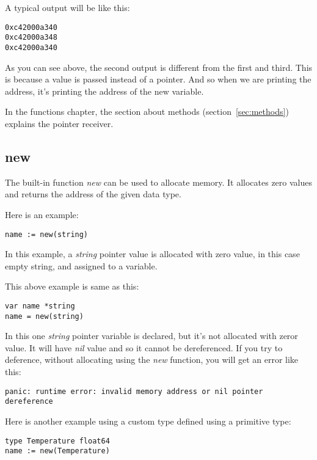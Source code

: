 A typical output will be like this:

\begin{lstlisting}[numbers=none]
0xc42000a340
0xc42000a348
0xc42000a340
\end{lstlisting}

As you can see above, the second output is different from the first
and third.  This is because a value is passed instead of a pointer.
And so when we are printing the address, it's printing the address of
the new variable.

In the functions chapter, the section about methods
(section~\ref{sec:methods}) explains the pointer receiver.

\subsection{new}

The built-in function \textit{new} can be used to allocate memory.  It
allocates zero values and returns the address of the given data type.

Here is an example:

\begin{lstlisting}[numbers=none]
name := new(string)
\end{lstlisting}

In this example, a \textit{string} pointer value is allocated with
zero value, in this case empty string, and assigned to a variable.

This above example is same as this:

\begin{lstlisting}[numbers=none]
var name *string
name = new(string)
\end{lstlisting}

In this one \textit{string} pointer variable is declared, but it's not
allocated with zeror value.  It will have \textit{nil} value and so it
cannot be dereferenced.  If you try to deference, without allocating
using the \textit{new} function, you will get an error like this:

\begin{lstlisting}[numbers=none]
panic: runtime error: invalid memory address or nil pointer
dereference
\end{lstlisting}

Here is another example using a custom type defined using a primitive
type:

\begin{lstlisting}[numbers=none]
type Temperature float64
name := new(Temperature)
\end{lstlisting}

